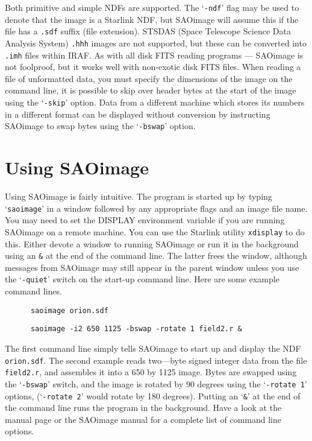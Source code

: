 Both primitive and simple NDFs are supported. The `{\tt -ndf}' flag may
be used to denote that the image is a Starlink NDF, but SAOimage will
assume this if the file has a {\tt .sdf} suffix (file extension). 
STSDAS (Space Telescope Science Data Analysis System) {\tt .hhh} images
are not supported, but these can be converted into {\tt .imh} files
within IRAF. As with all disk FITS reading programs --- SAOimage is not
foolproof, but it works well with non-exotic disk FITS files. When reading a
file of unformatted data, you must specify the dimensions of the image
on the command line, it is possible to skip over header bytes at the
start of the image using the `{\tt -skip}' option. Data from a different
machine which stores its numbers in a different format can be
displayed without conversion by instructing SAOimage to swap bytes
using the `{\tt -bswap}' option.

\section{Using SAOimage} 

Using SAOimage is fairly intuitive. The program is started up by
typing `{\tt saoimage}' in a window followed by any appropriate flags
and an image file name. You may need to set the DISPLAY environment
variable if you are running SAOimage on a remote machine. You can use
the Starlink utility {\tt xdisplay} to do this. Either devote a window
to running SAOimage or run it in the background using an {\tt \&} at
the end of the command line. The latter frees the window, although
messages from SAOimage may still appear in the parent window unless
you use the `{\tt -quiet}' switch on the start-up command line. Here
are some example command lines.

\begin{verbatim}
      saoimage orion.sdf
\end{verbatim}

\begin{verbatim}
      saoimage -i2 650 1125 -bswap -rotate 1 field2.r &
\end{verbatim}

The first command line simply tells SAOimage to start up and display
the NDF {\tt orion.sdf}. The second example reads two---byte signed
integer data from the file {\tt field2.r}, and assembles it into a 650
by 1125 image. Bytes are swapped using the `{\tt -bswap}' switch, and
the image is rotated by 90 degrees using the `{\tt -rotate 1}'
options, (`{\tt -rotate 2}' would rotate by 180 degrees). Putting an
`{\tt \&}' at the end of the command line runs the program in the
background. Have a look at the manual page or the SAOimage manual for
a complete list of command line options.

